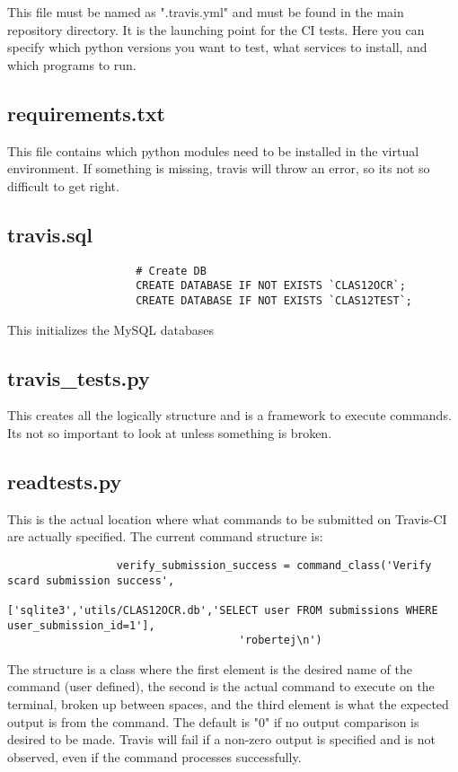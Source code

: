     This file must be named as ".travis.yml" and must be found in the main repository directory. It is the launching point for the CI tests. Here you can specify which python versions you want to test, what services to install, and which programs to run.
    
    \subsection{requirements.txt}
        This file contains which python modules need to be installed in the virtual environment. If something is missing, travis will throw an error, so its not so difficult to get right.
        
    \subsection{travis.sql}
                \begin{lstlisting}
                    # Create DB
                    CREATE DATABASE IF NOT EXISTS `CLAS12OCR`;
                    CREATE DATABASE IF NOT EXISTS `CLAS12TEST`;
                \end{lstlisting}
                This initializes the MySQL databases
                
    \subsection{travis\_tests.py}
        This creates all the logically structure and is a framework to execute commands. Its not so important to look at unless something is broken. 
        
    \subsection{readtests.py}
        This is the actual location where what commands to be submitted on Travis-CI are actually specified. The current command structure is:
        
                \begin{lstlisting}
                 verify_submission_success = command_class('Verify scard submission success',
                                    ['sqlite3','utils/CLAS12OCR.db','SELECT user FROM submissions WHERE user_submission_id=1'],
                                    'robertej\n')
                \end{lstlisting}        
        
       The structure is a class where the first element is the desired name of the command (user defined), the second is the actual command to execute on the terminal, broken up between spaces, and the third element is what the expected output is from the command. The default is "0" if no output comparison is desired to be made. Travis will fail if a non-zero output is specified and is not observed, even if the command processes successfully. 
    
    




